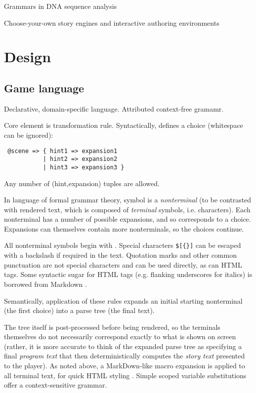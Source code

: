 \documentclass{acm_proc_article-sp}
\begin{document}
Grammars in DNA sequence analysis
\cite{Durbin98}

Choose-your-own story engines and interactive authoring environments
\cite{Twine,InkleWriter,ChoiceScript,Undum,RenPy}


\section{Design}

\subsection{Game language}

Declarative, domain-specific language.
Attributed context-free gramamr.

Core element is transformation rule.
Syntactically, defines a choice (whitespace can be ignored):
\begin{verbatim}
 @scene => { hint1 => expansion1
           | hint2 => expansion2
           | hint3 => expansion3 }
\end{verbatim}
Any number of (hint,expansion) tuples are allowed.

In language of formal grammar theory, symbol {\tt \@scene} is a {\em nonterminal}
(to be contrasted with rendered text, which is composed of {\em terminal} symbols, i.e. characters).
Each nonterminal has a number of possible expansions, and so corresponds to a choice.
Expansions can themselves contain more nonterminals, so the choices continue.

All nonterminal symbols begin with {\tt \@}.
Special characters {\tt \$\@[\{\}]} can be escaped with a backslash if required in the text.
Quotation marks and other common punctuation are not special characters and can be used directly, as can HTML tags.
Some syntactic sugar for HTML tags (e.g. flanking underscores for italics) is borrowed from Markdown \cite{Markdown}.

Semantically, application of these rules expands an initial starting nonterminal (the first choice) into a parse tree (the final text).

The tree itself is post-processed before being rendered,
so the terminals themselves do not necessarily correspond exactly to what is shown on screen
(rather, it is more accurate to think of the expanded parse tree as specifying a final {\em program text} that then deterministically computes the {\em story text} presented to the player).
As noted above, a MarkDown-like macro expansion is applied to all terminal text, for quick HTML styling \cite{Markdown}.
Simple scoped variable substitutions offer a context-sensitive grammar.
\end{document}
